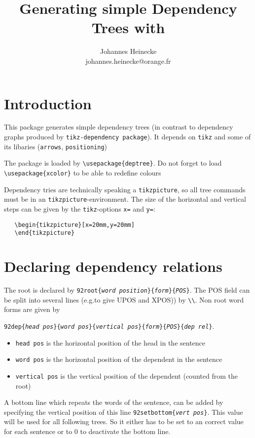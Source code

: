 \documentclass[12pt]{article}
\title{Generating simple Dependency Trees with \XeLaTeX}
\author{Johannes Heinecke\\johannes.heinecke@orange.fr}
\begin{document}
\maketitle


\section{Introduction}
This package generates simple dependency trees (in contrast to
dependency graphs produced by {\tt tikz-dependency package}).
It depends on {\tt tikz} and some of its libaries ({\tt arrows}, {\tt positioning})

The package is loaded by \verb:\usepackage{deptree}:. Do not forget to
load \verb:\usepackage{xcolor}: to be able to redefine colours


Dependency tries are technically speaking a \verb:tikzpicture:, so
all tree commands must be in an \verb:tikzpicture:-environment. The
size of the horizontal and vertical steps can be given by the
\verb:tikz:-options \verb:x=: and \verb:y=::


\begin{verbatim}
   \begin{tikzpicture}[x=20mm,y=20mm]
   \end{tikzpicture}
\end{verbatim}


\section{Declaring dependency relations}
The root is declared by {\tt\char92root\{\emph{word position}\}\{\emph{form}\}\{\emph{POS}\}}. 
The POS field can be split into several lines (e.g.to give UPOS and
XPOS)) by {\verb:\\:}.
Non root word forms are given by 

{\tt\char92dep\{\emph{head pos}\}\{\emph{word pos}\}\{\emph{vertical pos}\}\{\emph{form}\}\{\emph{POS}\}\{\emph{dep rel}\}}.

\begin{itemize}
\item \verb:head pos: is the horizontal position of the head in the sentence
\item \verb:word pos: is the horizontal position of the dependent in the sentence
\item \verb:vertical pos: is the vertical position of the dependent
  (counted from the root)
\end{itemize}

A bottom line which repeats the words of the sentence, can be added by
specifying the vertical position of this line
{\tt\char92setbottom\{\emph{vert pos}\}}. This value will be used for
all following trees. So it either has to be set to an correct value
for each sentence or to 0 to deactivate the bottom line.
\end{document}
